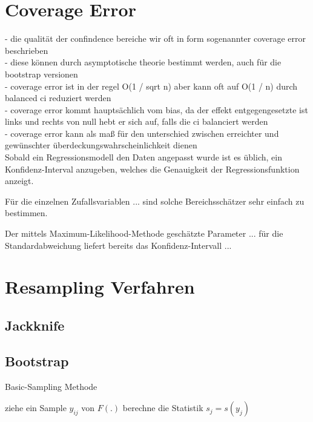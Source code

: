 \section{Coverage Error}
- die qualität der confindence bereiche wir oft in form sogenannter coverage error beschrieben\\
- diese können durch asymptotische theorie bestimmt werden, auch für die bootstrap versionen\\
- coverage error ist in der regel O(1 / sqrt n) aber kann oft auf O(1 / n) durch balanced ci reduziert werden \\
- coverage error kommt hauptsächlich vom bias, da der effekt entgegengesetzte ist links und rechts von null hebt er sich auf, falls die ci balanciert werden\\
- coverage error kann als maß für den unterschied zwischen erreichter und gewünschter überdeckungswahrscheinlichkeit dienen\\



Sobald ein Regressionsmodell den Daten angepasst wurde ist es üblich, ein Konfidenz-Interval anzugeben, welches die Genauigkeit der Regressionsfunktion anzeigt. 

Für die einzelnen Zufallsvariablen ... sind solche Bereichsschätzer sehr einfach zu bestimmen. 

Der mittels Maximum-Likelihood-Methode geschätzte Parameter ... für die Standardabweichung liefert bereits das Konfidenz-Intervall ... 


\section{Resampling Verfahren}

\subsection{Jackknife}

\subsection{Bootstrap}
\begin{algorithm} 
  \caption{Basic-Sampling Methode} 
  \label{algo:sampling} 

  \begin{algorithmic}
		    \STATE ziehe ein Sample $y_{ij}$ von $F(.)$
		  \ENDFOR
			\STATE berechne die Statistik $s_j = s(y_j)$
    \ENDFOR  
  \end{algorithmic}
\end{algorithm} 

